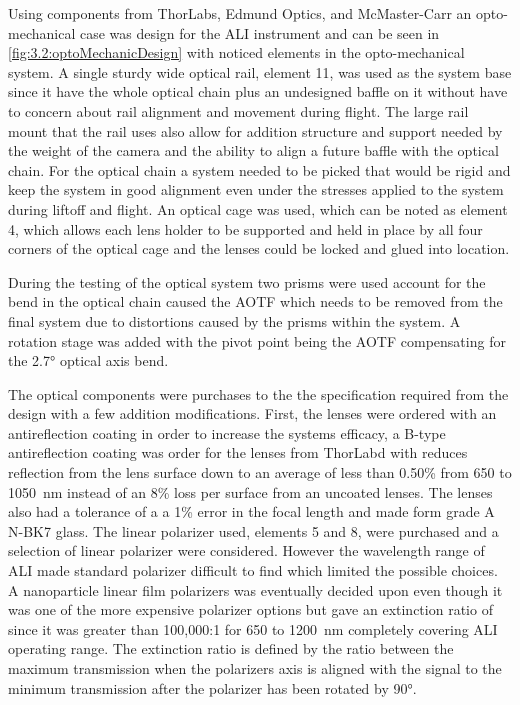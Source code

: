 Using components from ThorLabs, Edmund Optics, and McMaster-Carr an opto-mechanical case was design for the ALI instrument and can be seen in \autoref{fig:3.2:optoMechanicDesign} with noticed elements in the opto-mechanical system. A single sturdy wide optical rail, element 11, was used as the system base since it have the whole optical chain plus an undesigned baffle on it without have to concern about rail alignment and movement during flight. The large rail mount that the rail uses also allow for addition structure and support needed by the weight of the camera and the ability to align a future baffle with the optical chain. For the optical chain a system needed to be picked that would be rigid and keep the system in good alignment even under the stresses applied to the system during liftoff and flight. An optical cage was used, which can be noted as element 4, which allows each lens holder to be supported and held in place by all four corners of the optical cage and the lenses could be locked and glued into location. 

During the testing of the optical system two prisms were used account for the bend in the optical chain caused the AOTF which needs to be removed from the final system due to distortions caused by the prisms within the system. A rotation stage was added with the pivot point being the AOTF compensating for the 2.7\si{\degree} optical axis bend.

The optical components were purchases to the the specification required from the design with a few addition modifications. First, the lenses were ordered with an antireflection coating in order to increase the systems efficacy, a B-type antireflection coating was order for the lenses from ThorLabd with reduces reflection from the lens surface down to an average of less than 0.50\% from 650 to 1050~nm instead of an 8\% loss per surface from an uncoated lenses. The lenses also had a tolerance of a a 1\% error in the focal length and made form grade A N-BK7 glass. The linear polarizer used, elements 5 and 8, were purchased and a selection of linear polarizer were considered. However the wavelength range of ALI made standard polarizer difficult to find which limited the possible choices. A nanoparticle linear film polarizers was eventually decided upon even though it was one of the more expensive polarizer options but gave an extinction ratio of since it was greater than 100,000:1 for 650 to 1200~nm completely covering ALI operating range. The extinction ratio is defined by the ratio between the maximum transmission when the polarizers axis is aligned with the signal to the minimum transmission after the polarizer has been rotated by 90\si{\degree}. 

